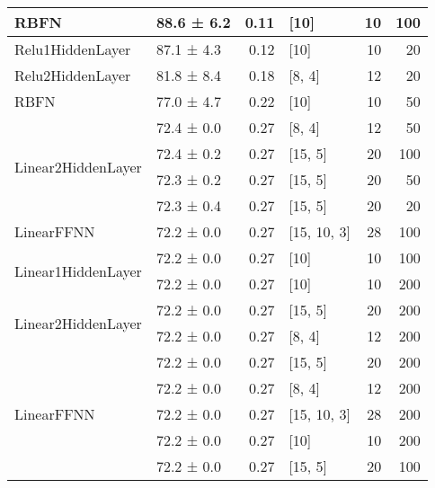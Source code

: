 \begin{longtable}{llrlrr}
 \hline
RBFN                                & 88.6 ± 6.2  &  0.11 & [10]           &         10 &      100 \\
 \hline
Relu1HiddenLayer                    & 87.1 ± 4.3  &  0.12 & [10]           &         10 &       20 \\
 \hline
Relu2HiddenLayer                    & 81.8 ± 8.4  &  0.18 & [8, 4]         &         12 &       20 \\
 \hline
RBFN                                & 77.0 ± 4.7  &  0.22 & [10]           &         10 &       50 \\
 \hline
\multirow{4}{*}{Linear2HiddenLayer} & 72.4 ± 0.0  &  0.27 & [8, 4]         &         12 &       50 \\
                                            & 72.4 ± 0.2  &  0.27 & [15, 5]        &         20 &      100 \\
                                            & 72.3 ± 0.2  &  0.27 & [15, 5]        &         20 &       50 \\
                                            & 72.3 ± 0.4  &  0.27 & [15, 5]        &         20 &       20 \\
 \hline
LinearFFNN                          & 72.2 ± 0.0  &  0.27 & [15, 10, 3]    &         28 &      100 \\
 \hline
\multirow{2}{*}{Linear1HiddenLayer} & 72.2 ± 0.0  &  0.27 & [10]           &         10 &      100 \\
                                            & 72.2 ± 0.0  &  0.27 & [10]           &         10 &      200 \\
 \hline
\multirow{2}{*}{Linear2HiddenLayer} & 72.2 ± 0.0  &  0.27 & [15, 5]        &         20 &      200 \\
                                            & 72.2 ± 0.0  &  0.27 & [8, 4]         &         12 &      200 \\
 \hline
\multirow{5}{*}{LinearFFNN}         & 72.2 ± 0.0  &  0.27 & [15, 5]        &         20 &      200 \\
                                            & 72.2 ± 0.0  &  0.27 & [8, 4]         &         12 &      200 \\
                                            & 72.2 ± 0.0  &  0.27 & [15, 10, 3]    &         28 &      200 \\
                                            & 72.2 ± 0.0  &  0.27 & [10]           &         10 &      200 \\
                                            & 72.2 ± 0.0  &  0.27 & [15, 5]        &         20 &      100 \\

\end{longtable}
